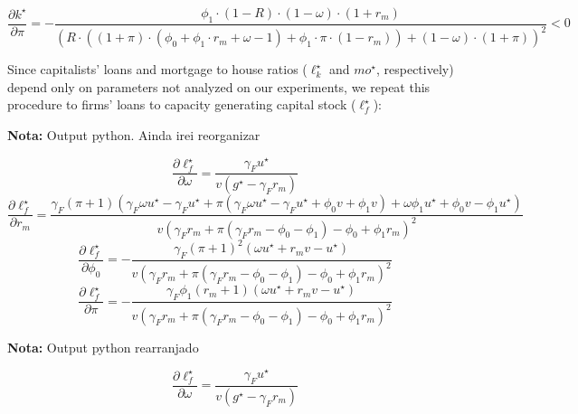 \documentclass[11pt]{article}
\begin{document}
\begin{equation}
\frac{\partial k^{\star}}{\partial \pi} = -\frac{\phi_1\cdot(1-R)\cdot(1-\omega)\cdot(1+r_m)}{(R\cdot((1+\pi)\cdot(\phi_0 + \phi_1\cdot r_m + \omega - 1) + \phi_1\cdot \pi \cdot(1-r_m)) + (1-\omega)\cdot(1+\pi))^2} < 0
\end{equation}

Since capitalists' loans and mortgage to house ratios (\(\ell^{\star}_{k}\) and \(mo^{\star}\), respectively) depend only on parameters not analyzed on our experiments, we repeat this  procedure to firms' loans to capacity generating capital stock (\(\ell^{\star}_f\)):

\textbf{Nota:} Output python. Ainda irei reorganizar

\begin{equation}\frac{\partial \ell_f^{\star}}{\partial \omega} = \frac{\gamma_{F} u^{\star}}{v \left(g^\star - \gamma_{F} r_{m}\right)}\end{equation}
\begin{equation}\frac{\partial \ell_f^{\star}}{\partial r_{m}} = \frac{\gamma_{F} \left(\pi + 1\right) \left(\gamma_{F} \omega u^{\star} - \gamma_{F} u^{\star} + \pi \left(\gamma_{F} \omega u^{\star} - \gamma_{F} u^{\star} + \phi_{0} v + \phi_{1} v\right) + \omega \phi_{1} u^{\star} + \phi_{0} v - \phi_{1} u^{\star}\right)}{v \left(\gamma_{F} r_{m} + \pi \left(\gamma_{F} r_{m} - \phi_{0} - \phi_{1}\right) - \phi_{0} + \phi_{1} r_{m}\right)^{2}}\end{equation}
\begin{equation}\frac{\partial \ell_f^{\star}}{\partial \phi_{0}} = - \frac{\gamma_{F} \left(\pi + 1\right)^{2} \left(\omega u^{\star} + r_{m} v - u^{\star}\right)}{v \left(\gamma_{F} r_{m} + \pi \left(\gamma_{F} r_{m} - \phi_{0} - \phi_{1}\right) - \phi_{0} + \phi_{1} r_{m}\right)^{2}}\end{equation}
\begin{equation}\frac{\partial \ell_f^{\star}}{\partial \pi} = - \frac{\gamma_{F} \phi_{1} \left(r_{m} + 1\right) \left(\omega u^{\star} + r_{m} v - u^{\star}\right)}{v \left(\gamma_{F} r_{m} + \pi \left(\gamma_{F} r_{m} - \phi_{0} - \phi_{1}\right) - \phi_{0} + \phi_{1} r_{m}\right)^{2}}\end{equation}


\textbf{Nota:} Output python rearranjado

\begin{equation}
\frac{\partial \ell_f^{\star}}{\partial \omega} = \frac{\gamma_{F} u^{\star}}{v \left(g^\star - \gamma_{F} r_{m}\right)}
\end{equation}
\end{document}
